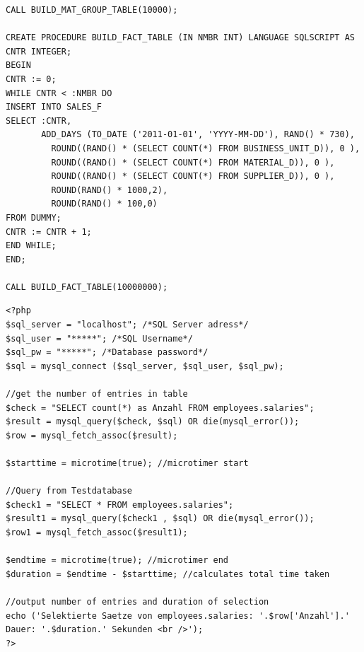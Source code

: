 \begin{lstlisting}
CALL BUILD_MAT_GROUP_TABLE(10000);
 
CREATE PROCEDURE BUILD_FACT_TABLE (IN NMBR INT) LANGUAGE SQLSCRIPT AS
CNTR INTEGER;
BEGIN
CNTR := 0;
WHILE CNTR < :NMBR DO
INSERT INTO SALES_F
SELECT :CNTR,
       ADD_DAYS (TO_DATE ('2011-01-01', 'YYYY-MM-DD'), RAND() * 730),
         ROUND((RAND() * (SELECT COUNT(*) FROM BUSINESS_UNIT_D)), 0 ),
         ROUND((RAND() * (SELECT COUNT(*) FROM MATERIAL_D)), 0 ),
         ROUND((RAND() * (SELECT COUNT(*) FROM SUPPLIER_D)), 0 ),
         ROUND(RAND() * 1000,2),
         ROUND(RAND() * 100,0)
FROM DUMMY;      
CNTR := CNTR + 1;
END WHILE;
END;
 
CALL BUILD_FACT_TABLE(10000000);
\end{lstlisting}

\begin{lstlisting}
<?php
$sql_server = "localhost"; /*SQL Server adress*/
$sql_user = "*****"; /*SQL Username*/
$sql_pw = "*****"; /*Database password*/
$sql = mysql_connect ($sql_server, $sql_user, $sql_pw);

//get the number of entries in table
$check = "SELECT count(*) as Anzahl FROM employees.salaries";
$result = mysql_query($check, $sql) OR die(mysql_error());
$row = mysql_fetch_assoc($result);

$starttime = microtime(true); //microtimer start

//Query from Testdatabase
$check1 = "SELECT * FROM employees.salaries";
$result1 = mysql_query($check1 , $sql) OR die(mysql_error());
$row1 = mysql_fetch_assoc($result1);

$endtime = microtime(true); //microtimer end
$duration = $endtime - $starttime; //calculates total time taken

//output number of entries and duration of selection
echo ('Selektierte Saetze von employees.salaries: '.$row['Anzahl'].' Dauer: '.$duration.' Sekunden <br />');
?>
\end{lstlisting}

